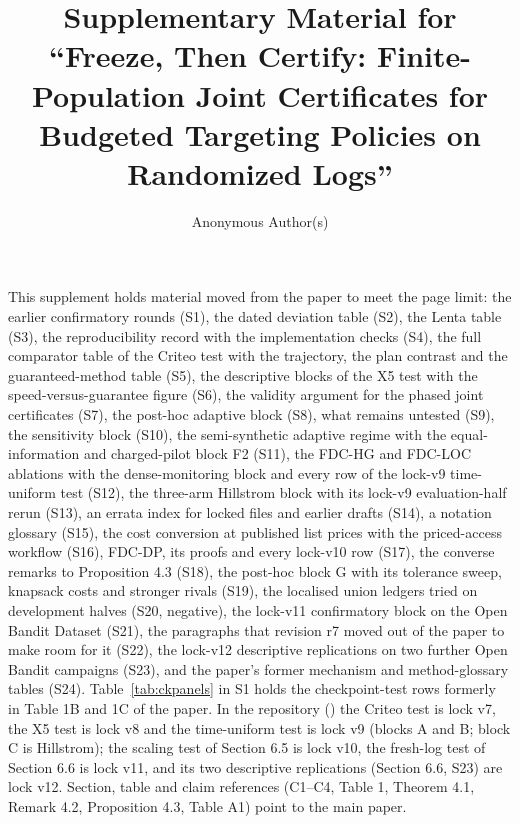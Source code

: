 \documentclass[sigconf,anonymous,review]{acmart}
\begin{document}
\sloppy
\title{Supplementary Material for ``Freeze, Then Certify: Finite-Population Joint Certificates for Budgeted Targeting Policies on Randomized Logs''}
\author{Anonymous Author(s)}
\maketitle

This supplement holds material moved from the paper to meet the page limit: the earlier confirmatory rounds (S1), the dated deviation table (S2), the Lenta table (S3), the reproducibility record with the implementation checks (S4), the full comparator table of the Criteo test with the trajectory, the plan contrast and the guaranteed-method table (S5), the descriptive blocks of the X5 test with the speed-versus-guarantee figure (S6), the validity argument for the phased joint certificates (S7), the post-hoc adaptive block (S8), what remains untested (S9), the sensitivity block (S10), the semi-synthetic adaptive regime with the equal-information and charged-pilot block F2 (S11), the FDC-HG and FDC-LOC ablations with the dense-monitoring block and every row of the lock-v9 time-uniform test (S12), the three-arm Hillstrom block with its lock-v9 evaluation-half rerun (S13), an errata index for locked files and earlier drafts (S14), a notation glossary (S15), the cost conversion at published list prices with the priced-access workflow (S16), FDC-DP, its proofs and every lock-v10 row (S17), the converse remarks to Proposition 4.3 (S18), the post-hoc block G with its tolerance sweep, knapsack costs and stronger rivals (S19), the localised union ledgers tried on development halves (S20, negative), the lock-v11 confirmatory block on the Open Bandit Dataset (S21), the paragraphs that revision r7 moved out of the paper to make room for it (S22), the lock-v12 descriptive replications on two further Open Bandit campaigns (S23), and the paper's former mechanism and method-glossary tables (S24). Table~\ref{tab:ckpanels} in S1 holds the checkpoint-test rows formerly in Table 1B and 1C of the paper. In the repository (\anonrepo) the Criteo test is lock v7, the X5 test is lock v8 and the time-uniform test is lock v9 (blocks A and B; block C is Hillstrom); the scaling test of Section 6.5 is lock v10, the fresh-log test of Section 6.6 is lock v11, and its two descriptive replications (Section 6.6, S23) are lock v12. Section, table and claim references (C1--C4, Table 1, Theorem 4.1, Remark 4.2, Proposition 4.3, Table A1) point to the main paper.
\end{document}
